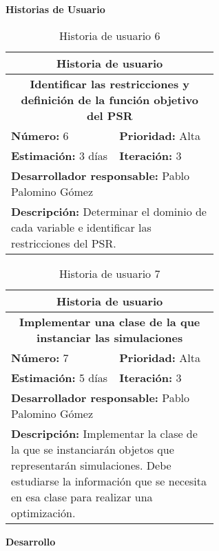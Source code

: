 \textbf{Historias de Usuario}\\
\begin{table}[H]
        \centering
        \begin{tabular}{|p{0.3\linewidth}|p{0.3\linewidth}|}
          \hline
          \multicolumn{2}{|c|}{Historia de usuario}\\ \hline
          \multicolumn{2}{|c|}{\textbf{Identificar las restricciones y definición de la función objetivo del PSR}}\\ \hline
          \textbf{Número:} 6 & \textbf{Prioridad:} Alta\\ \hline
          \textbf{Estimación:} 3 días & \textbf{Iteración:} 3\\ \hline
          \multicolumn{2}{|l|}{\textbf{Desarrollador responsable:} Pablo Palomino Gómez}\\ \hline
          \multicolumn{2}{|p{0.8\linewidth}|}{\textbf{Descripción:} Determinar el dominio de cada variable e identificar las restricciones del \gls{PSR}.}\\ \hline
        \end{tabular}
        \caption{Historia de usuario 6}
        \label{tab:hist6}
\end{table}
\begin{table}[H]
        \centering
        \begin{tabular}{|p{0.3\linewidth}|p{0.3\linewidth}|}
          \hline
          \multicolumn{2}{|c|}{Historia de usuario}\\ \hline
          \multicolumn{2}{|c|}{\textbf{Implementar una clase de la que instanciar las simulaciones}}\\ \hline
          \textbf{Número:} 7 & \textbf{Prioridad:} Alta\\ \hline
          \textbf{Estimación:} 5 días & \textbf{Iteración:} 3\\ \hline
          \multicolumn{2}{|l|}{\textbf{Desarrollador responsable:} Pablo Palomino Gómez}\\ \hline
          \multicolumn{2}{|p{0.6\linewidth}|}{\textbf{Descripción:} Implementar la clase de la que se instanciarán objetos que representarán simulaciones. Debe estudiarse la información que se necesita en esa clase para realizar una optimización.}\\ \hline
        \end{tabular}
        \caption{Historia de usuario 7}
        \label{tab:hist7}
\end{table}
\textbf{Desarrollo}\\

